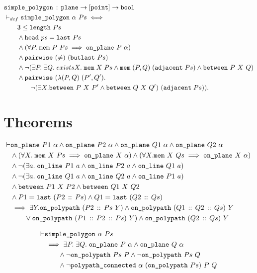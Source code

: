 \begin{align*}
  &\texttt{simple\_polygon}\,:\,\texttt{plane} \rightarrow [\texttt{point}] \rightarrow \texttt{bool}\\
  &\vdash_{def}\texttt{simple\_polygon}\ \alpha\ Ps \iff \\
  &\qquad 3 \leq \texttt{length}\ Ps\\
  &\qquad\wedge \texttt{head}\ ps = \texttt{last}\ Ps\\
  &\qquad\wedge (\forall P.\;\texttt{mem}\ P\ Ps \implies \texttt{on\_plane}\ P\ \alpha)\\
  &\qquad\wedge \texttt{pairwise}\ (\neq)\ (\texttt{butlast}\ Ps)\\
  &\qquad\wedge \neg(\exists P.\;\exists Q.\;exists X.\; \texttt{mem}\;X\;Ps\wedge\texttt{mem}\;(P,Q)\;(\texttt{adjacent}\;Ps)\wedge\texttt{between}\ P\ X\ Q)\\
  &\qquad\wedge \texttt{pairwise}\ (\lambda(P,Q)\;(P',Q').\\
  &\qquad\qquad\neg(\exists X. \texttt{between}\ P\ X\ P' \wedge \texttt{between}\ Q\ X\ Q')\ (\texttt{adjacent}\;Ps)).
\end{align*}

\section{Theorems}
\begin{align*}
\vdash &\code{on\_plane}\ P1\ \alpha \wedge \code{on\_plane}\ P2\ \alpha \wedge \code{on\_plane}\ Q1\ \alpha \wedge \code{on\_plane}\ Q2\ \alpha\\
       &\wedge(\forall X.\;\code{mem}\ X\ Ps \implies \code{on\_plane}\ X\ \alpha) \wedge (\forall X. \code{mem}\ X\ Qs \implies \code{on\_plane}\ X\ \alpha)\\
       &\wedge\Triangle{a}{P1}{P2}{Q1}\\
       &\wedge\Triangle{a}{Q1}{Q2}{P1}\\
       &\wedge\code{between}\ P1\ X\ P2 \wedge \code{between}\ Q1\ X\ Q2\\
       &\wedge P1 = \code{last}\ (\cons{P2}{Ps}) \wedge Q1 = \code{last}\ (\cons{Q2}{Qs})\\
       &\implies \exists Y. \code{on\_polypath}\ (\cons{P2}{Ps}\ Y) \wedge \code{on\_polypath}\ (\cons{Q1}{\cons{Q2}{Qs}})\ Y\\
       &\qquad\vee \code{on\_polypath}\ (\cons{P1}{\cons{P2}{Ps}})\ Y) \wedge \code{on\_polypath}\ (\cons{Q2}{Qs})\ Y
\end{align*}

\begin{align*}
\vdash &\code{simple\_polygon}\ \alpha\ Ps\\
       &\implies \exists P.\;\exists Q.\; \code{on\_plane}\ P\ \alpha \wedge \code{on\_plane}\ Q\ \alpha\\
       &\qquad\wedge \neg\code{on\_polypath}\ Ps\ P \wedge \neg\code{on\_polypath}\ Ps\ Q\\
       &\qquad\wedge \neg\code{polypath\_connected}\ \alpha\ (\code{on\_polypath}\ Ps)\ P\ Q
\end{align*}

